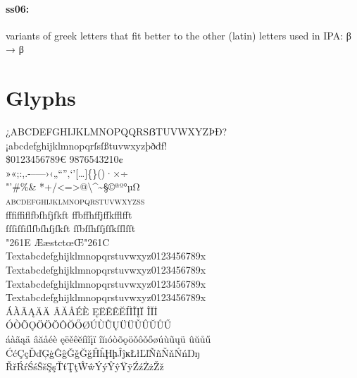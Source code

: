 \documentclass[pagesize,DIV14]{scrartcl}
\begin{document}
\paragraph*{ss06:} variants of greek letters that fit better to the other (latin) letters used in IPA: β → {β}

\clearpage
\section{Glyphs}
\fontsize{16}{16}
\begin{center}
{
¿ABCDEFGHIJKLMNOPQQRSẞTUVWXYZÞÐ?\\
¡abcdefghijklmnopqrſsſßtuvwxyzþðđf!\\
\$0123456789€  {9876543210}¢\\
»«;:,.-–—›‹„“”‚‘’[…]\{\}()·×÷\\
"'\#\%\& *+/<=>@\textbackslash \textasciicircum \textasciitilde §©ªº°µΩ\\
\textsc{abcdefghijklmnopqrstuvwxyzß}\\ 
fffiffiflfbfhfjfkft%
ffbffhffjffkfflfft\\
ſſſiſſiſlſbſhſjſkſt%
ſſbſſhſſjſſkſſlſſt\\
\char"261E ÆæstctœŒ\char"261C\\
{
Text{abcdefghijklmnopqrstuvwxyz0123456789}x %
Text{abcdefghijklmnopqrstuvwxyz0123456789}x\\
Text{abcdefghijklmnopqrstuvwxyz0123456789}x %
Text{abcdefghijklmnopqrstuvwxyz0123456789}x}\\
ÁÀÃĄÄ{Ä}%
ÂĂÅÉÈ%
ĘËĚÊĔÍÌĨĮÏ%
ÎĬİ\\
ÓÒÕǪÖ{Ö}ǑÔŎŐØÚÙŨŲÜ{Ü}ǓÛŬŮŰ\\
áàãąä%
âăåéè%
ęëěêĕíìĩįï%
îĭıóòõǫöǒôǒőøúùũųü%
ûŭůű\\
ĆćÇçĎďĢģĜĝǦǧĞğĤĥḨḩĴĵĸŁłĽľÑñŇňŃńŊŋ\\
ŘřŔŕŚśŠšŞşŤťŢţŴŵÝýŶŷŸÿŹźŻżŽž\\
{%
}}
\end{center}
\end{document}
